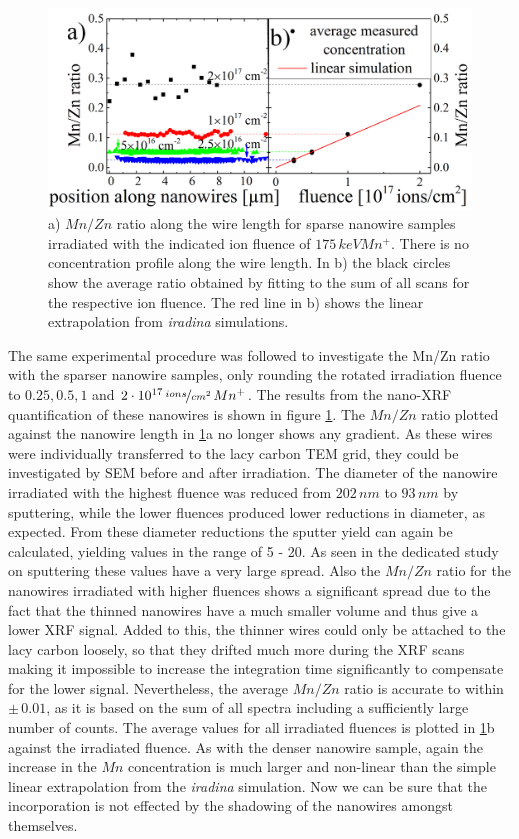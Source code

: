 \begin{figure}
	\centering
		\includegraphics[width=.85\textwidth]{images/MnZn2.png}
	\caption{a) $Mn/Zn$ ratio along the wire length for sparse nanowire samples irradiated with the indicated ion fluence of $175\,keV Mn^+$. There is no concentration profile along the wire length. In b) the black circles show the average ratio obtained by fitting to the sum of all scans for the respective ion fluence. The red line in b) shows the linear extrapolation from \emph{iradina} simulations. }
	\label{MnZn2}
\end{figure} 

The same experimental procedure was followed to investigate the Mn/Zn ratio with the sparser nanowire samples, only rounding the rotated irradiation fluence to $0.25, 0.5, 1$ and $2\cdot 10^{17}\,\nicefrac{ions}{cm^2}\,Mn^+$. The results from the nano-XRF quantification of these nanowires is shown in figure \ref{MnZn2}. The $Mn/Zn$ ratio plotted against the nanowire length in \ref{MnZn2}a no longer shows any gradient. As these wires were individually transferred to the lacy carbon TEM grid, they could be investigated by SEM before and after irradiation. The diameter of the nanowire irradiated with the highest fluence was reduced from $202\,nm$ to $93\,nm$ by sputtering, while the lower fluences produced lower reductions in diameter, as expected. From these diameter reductions the sputter yield can again be calculated, yielding values in the range of 5 - 20. As seen in the dedicated study on sputtering these values have a very large spread. Also the $Mn/Zn$ ratio for the nanowires irradiated with higher fluences shows a significant spread due to the fact that the thinned nanowires have a much smaller volume and thus give a lower XRF signal. Added to this, the thinner wires could only be attached to the lacy carbon loosely, so that they drifted much more during the XRF scans making it impossible to increase the integration time significantly to compensate for the lower signal. Nevertheless, the average $Mn/Zn$ ratio is accurate to within $\pm\,0.01$, as it is based on the sum of all spectra including a sufficiently large number of counts. The average values for all irradiated fluences is plotted in \ref{MnZn2}b against the irradiated fluence. As with the denser nanowire sample, again the increase in the $Mn$ concentration is much larger and non-linear than the simple linear extrapolation from the \emph{iradina} simulation. Now we can be sure that the incorporation is not effected by the shadowing of the nanowires amongst themselves.



